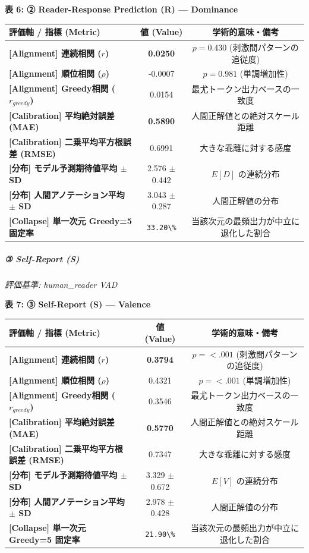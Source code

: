 \textbf{表 6: ② Reader-Response Prediction (R) — Dominance}
\begin{center}
\small
\begin{tabular}{lcc}
\toprule
\textbf{評価軸 / 指標 (Metric)} & \textbf{値 (Value)} & \textbf{学術的意味・備考} \\
\midrule
\textbf{[Alignment] 連続相関 ($r$)} & \textbf{0.0250} & $p = 0.430 $ (刺激間パターンの追従度) \\
\textbf{[Alignment] 順位相関 ($\rho$)} & -0.0007 & $p = 0.981 $ (単調増加性) \\
\textbf{[Alignment] Greedy相関 ($r_{greedy}$)} & 0.0154 & 最尤トークン出力ベースの一致度 \\
\textbf{[Calibration] 平均絶対誤差 (MAE)} & \textbf{0.5890} & 人間正解値との絶対スケール距離 \\
\textbf{[Calibration] 二乗平均平方根誤差 (RMSE)} & 0.6991 & 大きな乖離に対する感度 \\
\textbf{[分布] モデル予測期待値平均 $\pm$ SD} & 2.576 $\pm$ 0.442 & $E[D]$ の連続分布 \\
\textbf{[分布] 人間アノテーション平均 $\pm$ SD} & 3.043 $\pm$ 0.287 & 人間正解値の分布 \\
\textbf{[Collapse] 単一次元 Greedy=5 固定率} & \texttt{33.20\textbackslash{}\%} & 当該次元の最頻出力が中立に退化した割合 \\
\bottomrule
\end{tabular}
\end{center}


\subparagraph{③ Self-Report (S)}
\textit{評価基準: human\_reader VAD}

\textbf{表 7: ③ Self-Report (S) — Valence}
\begin{center}
\small
\begin{tabular}{lcc}
\toprule
\textbf{評価軸 / 指標 (Metric)} & \textbf{値 (Value)} & \textbf{学術的意味・備考} \\
\midrule
\textbf{[Alignment] 連続相関 ($r$)} & \textbf{0.3794} & $p = <.001 $ (刺激間パターンの追従度) \\
\textbf{[Alignment] 順位相関 ($\rho$)} & 0.4321 & $p = <.001 $ (単調増加性) \\
\textbf{[Alignment] Greedy相関 ($r_{greedy}$)} & 0.3546 & 最尤トークン出力ベースの一致度 \\
\textbf{[Calibration] 平均絶対誤差 (MAE)} & \textbf{0.5770} & 人間正解値との絶対スケール距離 \\
\textbf{[Calibration] 二乗平均平方根誤差 (RMSE)} & 0.7347 & 大きな乖離に対する感度 \\
\textbf{[分布] モデル予測期待値平均 $\pm$ SD} & 3.329 $\pm$ 0.672 & $E[V]$ の連続分布 \\
\textbf{[分布] 人間アノテーション平均 $\pm$ SD} & 2.978 $\pm$ 0.428 & 人間正解値の分布 \\
\textbf{[Collapse] 単一次元 Greedy=5 固定率} & \texttt{21.90\textbackslash{}\%} & 当該次元の最頻出力が中立に退化した割合 \\
\bottomrule
\end{tabular}
\end{center}


